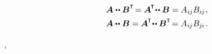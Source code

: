 \nopagebreak\vspace{-0.3em}
\begin{equation}\label{transposingoneofthetwo.doubledotproduct}
\begin{gathered}
\bm{A} \dotdotp \bm{B}^{\T} \hspace{-0.3ex}
=
\bm{A}^{\hspace{-0.16ex}\T} \hspace{-0.4ex} \dotdotp \bm{B}
=
A_{\hspace{.1ex}i\hspace{-0.1ex}j} B_{i\hspace{-0.1ex}j}
\hspace{.1ex} ,
\\
\bm{A} \dotdotp \bm{B}
=
\bm{A}^{\hspace{-0.16ex}\T} \hspace{-0.4ex} \dotdotp \bm{B}^{\T} \hspace{-0.3ex}
=
A_{\hspace{.1ex}i\hspace{-0.1ex}j} B_{\hspace{-0.1ex}j\hspace{-0.06ex}i}
\hspace{.2ex} .
\end{gathered}
\end{equation}

\vspace{-0.2em}
,

